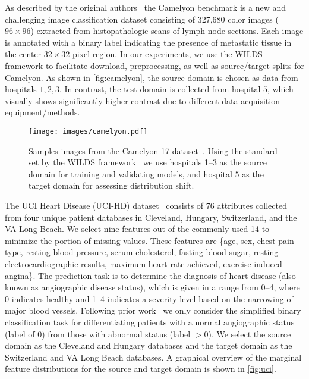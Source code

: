 \smallbreak
{}
As described by the original authors~\citep{camelyon} the Camelyon benchmark is a new and challenging image classification dataset consisting of 327,680 color images ($96 \times 96$) extracted from histopathologic scans of lymph node sections.
Each image is annotated with a binary label indicating the presence of metastatic tissue in the center $32\times 32$ pixel region.
In our experiments, we use the WILDS~\citep{wilds} framework to facilitate download, preprocessing, as well as source/target splits for Camelyon.
As shown in \autoref{fig:camelyon}, the source domain is chosen as data from hospitals $1,2,3$.
In contrast, the test domain is collected from hospital $5$, which visually shows significantly higher contrast due to different data acquisition equipment/methods.
\begin{figure}[!htb]
    \centering
    \hspace{-1cm}
    \texttt{[image: images/camelyon.pdf]}
    \caption{Samples images from the Camelyon 17 dataset~\citep{camelyon}. Using the standard set by the WILDS framework~\citep{wilds} we use hospitals 1--3 as the source domain for training and validating models, and hospital $5$ as the target domain for assessing distribution shift.}
    \label{fig:camelyon}
\end{figure}

\smallbreak
{}
The UCI Heart Disease (UCI-HD) dataset~\citep{misc_heart_disease_45} consists of 76 attributes collected from four unique patient databases in Cleveland, Hungary, Switzerland, and the VA Long Beach.
We select nine features out of the commonly used 14 to minimize the portion of missing values.
These features are \{age, sex, chest pain type, resting blood pressure, serum cholesterol, fasting blood sugar, resting electrocardiographic results, maximum heart rate achieved, exercise-induced angina\}.
The prediction task is to determine the diagnosis of heart disease (also known as angiographic disease status), which is given in a range from 0--4, where 0 indicates healthy and 1--4 indicates a severity level based on the narrowing of major blood vessels.
Following prior work~\citep{Chaki2015ACO} we only consider the simplified binary classification task for differentiating patients with a normal angiographic status (label of 0) from those with abnormal status (label $>0$).
We select the source domain as the Cleveland and Hungary databases and the target domain as the Switzerland and VA Long Beach databases.
A graphical overview of the marginal feature distributions for the source and target domain is shown in \autoref{fig:uci}.

